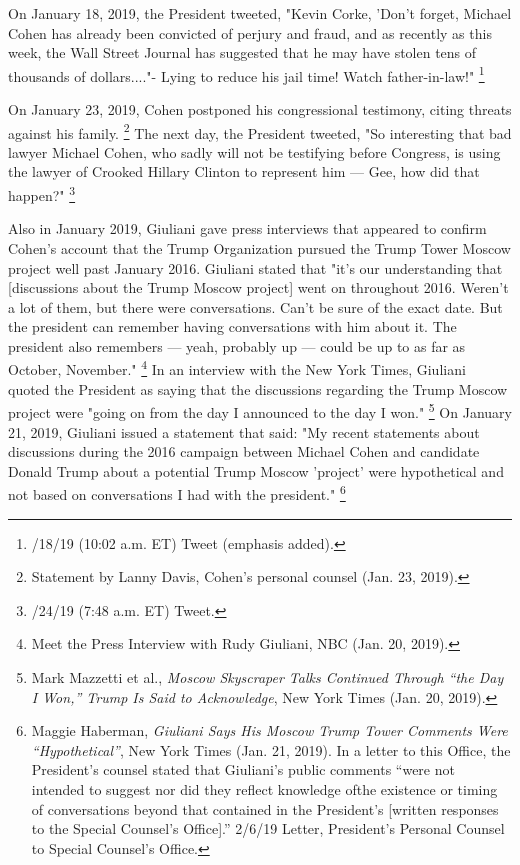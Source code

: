 On January 18, 2019, the President tweeted, "Kevin Corke, \@FoxNews 'Don't forget, Michael Cohen has already been convicted of perjury and fraud, and as recently as this week, the Wall Street Journal has suggested that he may have stolen tens of thousands of dollars...."- Lying to reduce his jail time! Watch father-in-law!"%
\footnote{/18/19 (10:02 a.m. ET) Tweet (emphasis added).}

On January 23, 2019, Cohen postponed his congressional testimony, citing threats against his family.%
\footnote{Statement by Lanny Davis, Cohen’s personal counsel (Jan. 23, 2019).}
The next day, the President tweeted, "So interesting that bad lawyer Michael Cohen, who sadly will not be testifying before Congress, is using the lawyer of Crooked Hillary Clinton to represent him — Gee, how did that happen?"%
\footnote{/24/19 (7:48 a.m. ET) Tweet.}

Also in January 2019, Giuliani gave press interviews that appeared to confirm Cohen's account that the Trump Organization pursued the Trump Tower Moscow project well past January 2016.
Giuliani stated that "it's our understanding that [discussions about the Trump Moscow project] went on throughout 2016.
Weren't a lot of them, but there were conversations.
Can't be sure of the exact date.
But the president can remember having conversations with him about it.
The president also remembers — yeah, probably up — could be up to as far as October, November."%
\footnote{Meet the Press Interview with Rudy Giuliani, NBC (Jan. 20, 2019).}
In an interview with the New York Times, Giuliani quoted the President as saying that the discussions regarding the Trump Moscow project were "going on from the day I announced to the day I won."%
\footnote{Mark Mazzetti et al., \textit{Moscow Skyscraper Talks Continued Through “the Day I Won,” Trump Is Said to Acknowledge}, New York Times (Jan. 20, 2019).}
On January 21, 2019, Giuliani issued a statement that said: "My recent statements about discussions during the 2016 campaign between Michael Cohen and candidate Donald Trump about a potential Trump Moscow 'project' were hypothetical and not based on conversations I had with the president."%
\footnote{Maggie Haberman, \textit{Giuliani Says His Moscow Trump Tower Comments Were “Hypothetical”}, New York Times (Jan. 21, 2019).
In a letter to this Office, the President’s counsel stated that Giuliani’s public comments “were not intended to suggest nor did they reflect knowledge ofthe existence or timing of conversations beyond that contained in the President’s [written responses to the Special Counsel’s Office].”
2/6/19 Letter, President’s Personal Counsel to Special Counsel’s Office.}

